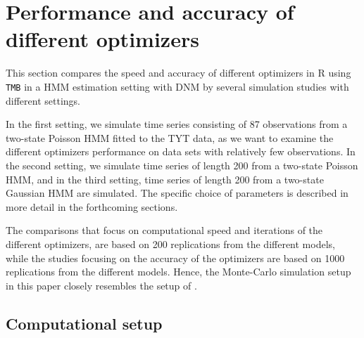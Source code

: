 \documentclass[]{interact}\usepackage[]{graphicx}\usepackage[dvipsnames]{xcolor}
\theoremstyle{plain}%
\theoremstyle{definition}
\theoremstyle{remark}
\begin{document}
\section{Performance and accuracy of different optimizers}
\label{sec:optimization}

This section compares the speed and accuracy of different optimizers in R using {\tt{TMB}} in a HMM estimation setting with DNM by several simulation studies with different settings.

In the first setting, we simulate time series consisting of 87 observations from a two-state Poisson HMM fitted to the TYT data, as we want to examine the different optimizers performance on data sets with relatively few observations.
In the second setting, we simulate time series of length 200 from a two-state Poisson HMM, and in the third setting, time series of length 200 from a two-state Gaussian HMM are simulated.
The specific choice of parameters is described in more detail in the forthcoming sections. 


The comparisons that focus on computational speed and iterations of the different optimizers, are based on 200 replications from the different models, while the studies focusing on the accuracy of the optimizers are based on 1000 replications from the different models. 
Hence, the Monte-Carlo simulation setup in this paper closely resembles the setup of \cite{bacri}.

\subsection{Computational setup}
\end{document}
